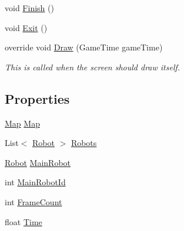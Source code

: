 \begin{DoxyCompactItemize}
void \hyperlink{classgearit_1_1src_1_1_network_1_1_network_client_game_af133b638d157f12773a6f99505189143}{Finish} ()
\item 
void \hyperlink{classgearit_1_1src_1_1_network_1_1_network_client_game_ab7b422daf5c2838dc0f8684de6df5346}{Exit} ()
\item 
override void \hyperlink{classgearit_1_1src_1_1_network_1_1_network_client_game_a136538e789edbf72b06f0c6715fb8cdc}{Draw} (Game\+Time game\+Time)
\begin{DoxyCompactList}\small\item\em This is called when the screen should draw itself. \end{DoxyCompactList}\end{DoxyCompactItemize}
\subsection*{Properties}
\begin{DoxyCompactItemize}
\item 
\hyperlink{classgearit_1_1src_1_1map_1_1_map}{Map} \hyperlink{classgearit_1_1src_1_1_network_1_1_network_client_game_a639aac62df9dabbfaf520818d5993f07}{Map}
\item 
List$<$ \hyperlink{classgearit_1_1src_1_1robot_1_1_robot}{Robot} $>$ \hyperlink{classgearit_1_1src_1_1_network_1_1_network_client_game_a983ce191370a8a6c17af5de5efeb23ac}{Robots}
\item 
\hyperlink{classgearit_1_1src_1_1robot_1_1_robot}{Robot} \hyperlink{classgearit_1_1src_1_1_network_1_1_network_client_game_a9a4c5981b88db35f5c2b8fd51dc8cbae}{Main\+Robot}
\item 
int \hyperlink{classgearit_1_1src_1_1_network_1_1_network_client_game_af731a5a4f8858cdb8bd883517f66b3ba}{Main\+Robot\+Id}
\item 
int \hyperlink{classgearit_1_1src_1_1_network_1_1_network_client_game_a17d4e2d447ad8d5e224d4bedb584b034}{Frame\+Count}
\item 
float \hyperlink{classgearit_1_1src_1_1_network_1_1_network_client_game_a39a693a8202d3383a564251e102b2e39}{Time}
\end{DoxyCompactItemize}
